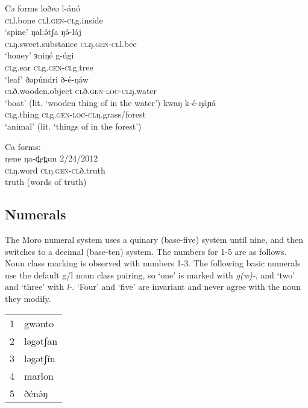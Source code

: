 \ea Cə forms
	\ea \gll	loðeə 		l-ánó\\
		\textsc{cl}l.bone  	\textsc{cl}l.\textsc{gen}-\textsc{cl}g.inside	\\
		\glt `spine’  
	\ex \gll	ŋalːə́tʃa		ŋə́-láj\\
		{\textsc{cl}ŋ.sweet.substance}  	\textsc{cl}ŋ.\textsc{gen}-\textsc{cl}l.bee\\
		\glt `honey’
	\ex \gll ɜniŋé 		g-úgi	\\
			\textsc{cl}g.ear  	\textsc{cl}g.\textsc{gen}-\textsc{cl}g.tree\\
		\glt `leaf’
	\ex \gll ðəpúndri 			ð-é-ŋáw\\
			{\textsc{cl}ð.wooden.object}  	 \textsc{cl}ð.\textsc{gen}-\textsc{loc}-\textsc{cl}ŋ.water\\
		\glt `boat’ (lit. `wooden thing of in the water')
	\ex	\gll kwaŋ 		k-é-ŋáɲá	\\			
		\textsc{cl}g.thing  	 \textsc{cl}g.\textsc{gen}-\textsc{loc}-\textsc{cl}ŋ.grass/forest \\
		\glt `animal’ (lit. `things of in the forest') %
	\z 
\z

\ea Ca forms:\\
\gll ŋene 		ŋa-d̪et̪am			2/24/2012\\
\textsc{cl}ŋ.word  	 \textsc{cl}ŋ.\textsc{gen}-\textsc{cl}ð.truth {} \\
\glt truth  (words of truth)  
\z



\subsection{Numerals}

The Moro numeral system uses a quinary (base-five) system until nine, and then switches to a decimal (base-ten) system. The numbers for 1-5 are as follows. Noun class marking is observed with numbers 1-3. The following basic numerals use the default g/l noun class pairing, so `one' is marked with \textit{g(w)-}, and `two' and `three' with \textit{l-}. `Four' and `five' are invariant and never agree with the noun they modify.

\ea \begin{tabular}[t]{ll}
1&	gwənto \\ 
2&	ləgətʃan \\ 
3&	ləgətʃín \\
4&	marlon \\
5&	ðénə́ŋ \\
 \end{tabular}
\z

